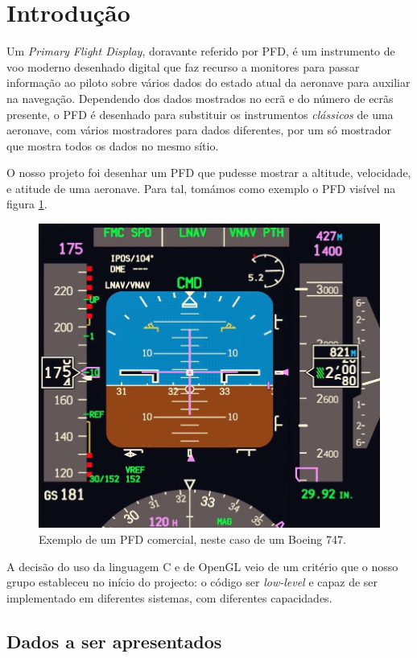 \documentclass[palatino]{ist-report}
\begin{document}
{\tableofcontents}

\pagebreak

\section{Introdução}

Um \textit{Primary Flight Display}, doravante referido por PFD, é um instrumento de voo moderno desenhado digital que faz recurso a monitores para passar informação ao piloto sobre vários dados do estado atual da aeronave para auxiliar na navegação. Dependendo dos dados mostrados no ecrã e do número de ecrãs presente, o PFD é desenhado para substituir os instrumentos \textit{clássicos} de uma aeronave, com vários mostradores para dados diferentes, por um só mostrador que mostra todos os dados no mesmo sítio.

O nosso projeto foi desenhar um PFD que pudesse mostrar a altitude, velocidade, e atitude de uma aeronave. Para tal, tomámos como exemplo o PFD visível na figura \ref{fig:pfd_example}.
\begin{figure}[ht]
    \centering
    \includegraphics[width = 0.8\linewidth]{pfd_example.png}
    \caption{Exemplo de um PFD comercial, neste caso de um Boeing 747.}
    \label{fig:pfd_example}
\end{figure}

A decisão do uso da linguagem C e de OpenGL veio de um critério que o nosso grupo estableceu no início do projecto: o código ser \textit{low-level} e capaz de ser implementado em diferentes sistemas, com diferentes capacidades.

\subsection{Dados a ser apresentados}\label{sec:data_to_show}
\end{document}
